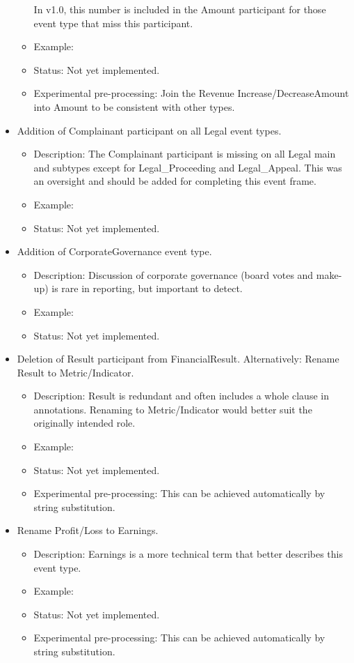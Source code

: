 \begin{itemize}[leftmargin=*]
\begin{itemize}
            In v1.0, this number is included in the Amount participant for those event type that miss this participant.
            \item Example: 
            \item Status: Not yet implemented.
            \item Experimental pre-processing: Join the Revenue Increase/DecreaseAmount into Amount to be consistent with other types.
        \end{itemize}
    \item Addition of Complainant participant on all Legal event types.
        \begin{itemize}
            \item Description: The Complainant participant is missing on all Legal main and subtypes except for Legal\_Proceeding and Legal\_Appeal. This was an oversight and should be added for completing this event frame.
            \item Example: 
            \item Status: Not yet implemented.
        \end{itemize}
    \item Addition of CorporateGovernance event type.
        \begin{itemize}
            \item Description: Discussion of corporate governance (board votes and make-up) is rare in reporting, but important to detect.
            \item Example: 
            \item Status: Not yet implemented.
        \end{itemize}
    \item Deletion of Result participant from FinancialResult. Alternatively: Rename Result to Metric/Indicator.
        \begin{itemize}
            \item Description: Result is redundant and often includes a whole clause in annotations. Renaming to Metric/Indicator would better suit the originally intended role.
            \item Example: 
            \item Status: Not yet implemented.
            \item Experimental pre-processing: This can be achieved automatically by string substitution.
        \end{itemize}
    \item Rename Profit/Loss to Earnings.
        \begin{itemize}
            \item Description: Earnings is a more technical term that better describes this event type.
            \item Example: 
            \item Status: Not yet implemented.
            \item Experimental pre-processing: This can be achieved automatically by string substitution.
        \end{itemize}
\end{itemize}

